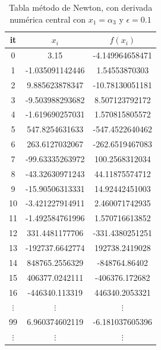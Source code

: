 \documentclass{article} %
\begin{document}
\begin{table}[H]
    \centering
    \begin{center}
\begin{tabular}{|c|c|c|}
\hline
it & $x_i$ & $f(x_i)$\\
\hline
0 & 3.15 & -4.149964658471\\
1 & -1.035091142446 & 1.54553870303\\
2 & 9.885623878347 & -10.78130051181\\
3 & -9.503988293682 & 8.507123792172\\
4 & -1.619690257031 & 1.570815805572\\
5 & 547.8254631633 & -547.4522640462\\
6 & 263.6127032067 & -262.6519467083\\
7 & -99.63335263972 & 100.2568312034\\
8 & -43.32630971243 & 44.11875574712\\
9 & -15.90506313331 & 14.92442451003\\
10 & -3.421227914911 & 2.460071742935\\
11 & -1.492584761996 & 1.570716613852\\
12 & 331.4481177706 & -331.4380251251\\
13 & -192737.6642774 & 192738.2419028\\
14 & 848765.2556329 & -848764.86402\\
15 & 406377.0242111 & -406376.172682\\
16 & -446340.113319 & 446340.2053321\\
$\vdots$ & $\vdots$ & $\vdots$\\
99 & 6.960374602119 & -6.181037605396\\
$\vdots$ & $\vdots$ & $\vdots$\\
\hline
\end{tabular}
\end{center}
    \caption{Tabla método de Newton, con derivada numérica central con $x_1 = \alpha_3$ y $\epsilon = 0.1$}
\end{table}
\end{document}
